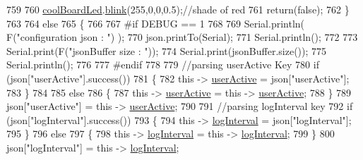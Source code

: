\begin{DoxyCode}
759     
760             \hyperlink{class_cool_board_a1b1d3c684a5baa56b08486e192fd8e97}{coolBoardLed}.\hyperlink{class_cool_board_led_a96e1ea13003eee34c9dbcef340404426}{blink}(255,0,0,0.5);\textcolor{comment}{//shade of red     }
761             \textcolor{keywordflow}{return}(\textcolor{keyword}{false});
762         \}
763 
764         \textcolor{keywordflow}{else}
765         \{   
766         
767 \textcolor{preprocessor}{        #if DEBUG == 1}
768             
769             Serial.println( F(\textcolor{stringliteral}{"configuration json : "}) );
770             json.printTo(Serial);
771             Serial.println();
772             
773             Serial.print(F(\textcolor{stringliteral}{"jsonBuffer size : "}));
774             Serial.print(jsonBuffer.size());
775             Serial.println();
776 
777 \textcolor{preprocessor}{        #endif}
778             
779             \textcolor{comment}{//parsing userActive Key}
780             \textcolor{keywordflow}{if} (json[\textcolor{stringliteral}{"userActive"}].success())
781             \{
782                 \textcolor{keyword}{this} -> \hyperlink{class_cool_board_a6395459131d6889a3005f79c7a35e964}{userActive} = json[\textcolor{stringliteral}{"userActive"}];
783             \}
784 
785             \textcolor{keywordflow}{else}
786             \{
787                 \textcolor{keyword}{this} -> \hyperlink{class_cool_board_a6395459131d6889a3005f79c7a35e964}{userActive} = \textcolor{keyword}{this} -> \hyperlink{class_cool_board_a6395459131d6889a3005f79c7a35e964}{userActive};
788             \}
789             json[\textcolor{stringliteral}{"userActive"}] = \textcolor{keyword}{this} -> \hyperlink{class_cool_board_a6395459131d6889a3005f79c7a35e964}{userActive};
790 
791             \textcolor{comment}{//parsing logInterval key}
792             \textcolor{keywordflow}{if} (json[\textcolor{stringliteral}{"logInterval"}].success())
793             \{
794                 \textcolor{keyword}{this} -> \hyperlink{class_cool_board_a84bc94413b64973e4aba8c467c97006c}{logInterval} = json[\textcolor{stringliteral}{"logInterval"}];
795             \}
796             \textcolor{keywordflow}{else}
797             \{
798                 \textcolor{keyword}{this} -> \hyperlink{class_cool_board_a84bc94413b64973e4aba8c467c97006c}{logInterval} = \textcolor{keyword}{this} -> \hyperlink{class_cool_board_a84bc94413b64973e4aba8c467c97006c}{logInterval};
799             \}
800             json[\textcolor{stringliteral}{"logInterval"}] = \textcolor{keyword}{this} -> \hyperlink{class_cool_board_a84bc94413b64973e4aba8c467c97006c}{logInterval};

\end{DoxyCode}
